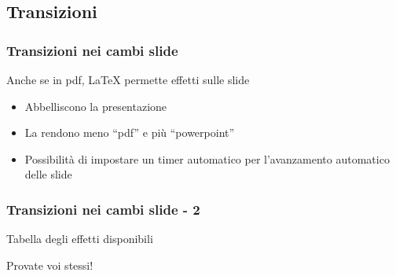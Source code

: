 \subsection{Transizioni} 
\begin{frame}
  \frametitle{Transizioni nei cambi slide}
  
  Anche se in pdf, \LaTeX{} permette effetti sulle slide
  \begin{itemize}
    \item Abbelliscono la presentazione
    \item La rendono meno ``pdf'' e più ``powerpoint''
    \item Possibilità di impostare un timer automatico per l'avanzamento 
automatico delle slide
  \end{itemize}

\end{frame}

\begin{frame}
  \frametitle{Transizioni nei cambi slide - 2}
  
  Tabella degli effetti disponibili
  
  
  Provate voi stessi! %
\end{frame}
